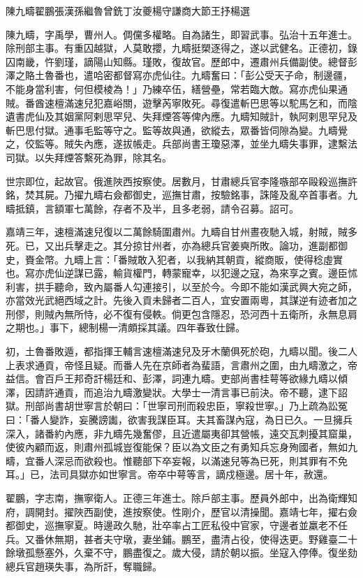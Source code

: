 
\begin{pinyinscope}
陳九疇翟鵬張漢孫繼魯曾銑丁汝夔楊守謙商大節王抒楊選

陳九疇，字禹學，曹州人。倜儻多權略。自為諸生，即習武事。弘治十五年進士。除刑部主事。有重囚越獄，人莫敢攖，九疇挺槊逐得之，遂以武健名。正德初，錄囚南畿，忤劉瑾，謫陽山知縣。瑾敗，復故官。歷郎中，遷肅州兵備副使。總督彭澤之賂土魯番也，遣哈密都督寫亦虎仙往。九疇奮曰：「彭公受天子命，制邊疆，不能身當利害，何但模棱為！」乃練卒伍，繕營壘，常若臨大敵。寫亦虎仙果通賊。番酋速檀滿速兒犯嘉峪關，遊擊芮寧敗死。尋復遣斬巴思等以駝馬乞和，而陰遺書虎仙及其姻黨阿剌思罕兒、失拜煙答等俾內應。九疇知賊計，執阿剌思罕兒及斬巴思付獄。通事毛監等守之。監等故與通，欲縱去，眾番皆伺隙為變。九疇覺之，佼監等。賊失內應，遂拔帳走。兵部尚書王瓊惡澤，並坐九疇失事罪，逮繫法司獄。以失拜煙答繫死為罪，除其名。

世宗即位，起故官。俄進陜西按察使。居數月，甘肅總兵官李隆嗾部卒毆殺巡撫許銘，焚其屍。乃擢九疇右僉都御史，巡撫甘肅，按驗銘事，誅隆及亂卒首事者。九疇抵鎮，言額軍七萬餘，存者不及半，且多老弱，請令召募。詔可。

嘉靖三年，速檀滿速兒復以二萬餘騎圍肅州。九疇自甘州晝夜馳入城，射賊，賊多死。已，又出兵擊走之。其分掠甘州者，亦為總兵官姜奭所敗。論功，進副都御史，賚金幣。九疇上言：「番賊敢入犯者，以我納其朝貢，縱商販，使得稔虛實也。寫亦虎仙逆謀已露，輸貨權門，轉蒙寵幸，以犯邊之寇，為來享之賓。邊臣怵利害，拱手聽命，致內屬番人勾連接引，以至於今。今即不能如漢武興大宛之師，亦當效光武絕西域之計。先後入貢未歸者二百人，宜安置兩粵，其謀逆有迹者加之刑僇，則賊內無所恃，必不復有侵軼。倘更包含隱忍，恐河西十五衛所，永無息肩之期也。」事下，總制楊一清頗採其議。四年春致仕歸。

初，土魯番敗遁，都指揮王輔言速檀滿速兒及牙木蘭俱死於砲，九疇以聞。後二人上表求通貢，帝怪且疑。而番人先在京師者為蜚語，言肅州之圍，由九疇激之，帝益信。會百戶王邦奇訐楊廷和、彭澤，詞連九疇。吏部尚書桂萼等欲緣九疇以傾澤，因請許通貢，而追治九疇激變狀。大學士一清言事已前決。帝不聽，逮下詔獄。刑部尚書胡世寧言於朝曰：「世寧司刑而殺忠臣，寧殺世寧。」乃上疏為訟冤曰：「番人變詐，妄騰謗讟，欲害我謀臣耳。夫其畜謀內寇，為日已久。一旦擁兵深入，諸番約內應，非九疇先幾奮僇，且近遣屬夷卻其營帳，遠交瓦刺擾其窟巢，使彼內顧而返，則肅州孤城豈復能保？臣以為文臣之有勇知兵忘身殉國者，無如九疇，宜番人深忌而欲殺也。惟聽部下卒妄報，以滿速兒等為已死，則其罪有不免耳。」已，法司具獄亦如世寧言。帝卒中萼等言，謫戍極邊。居十年，赦還。

翟鵬，字志南，撫寧衛人。正德三年進士。除戶部主事。歷員外郎中，出為衛輝知府，調開封。擢陜西副使，進按察使。性剛介，歷官以清操聞。嘉靖七年，擢右僉都御史，巡撫寧夏。時邊政久馳，壯卒率占工匠私役中官家，守邊者並羸老不任兵。又番休無期，甚者夫守墩，妻坐鋪。鵬至，盡清占役，使得迭更。野雞臺二十餘墩孤懸塞外，久棄不守，鵬盡復之。歲大侵，請於朝以振。坐寇入停俸。復坐劾總兵官趙瑛失事，為所訐，奪職歸。


\end{pinyinscope}

